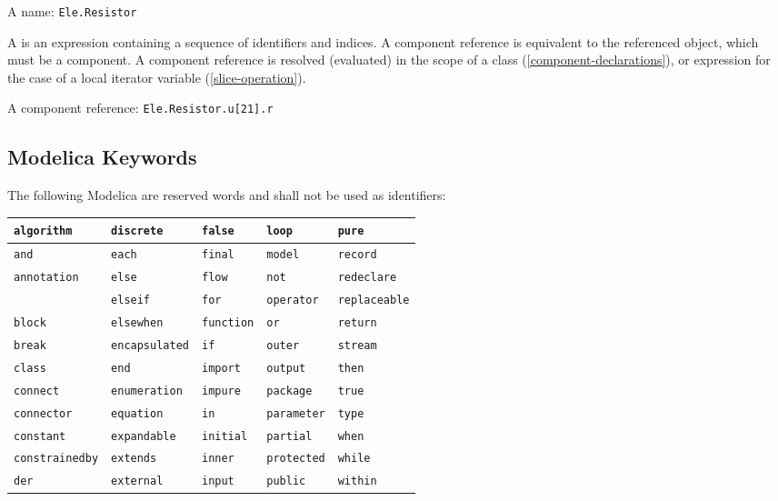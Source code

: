 \begin{example}
A name: \lstinline!Ele.Resistor!
\end{example}

A  is an expression containing a sequence of identifiers and indices.
A component reference is equivalent to the referenced object, which must be a component.
A component reference is resolved (evaluated) in the scope of a class (\cref{component-declarations}), or expression for the case of a local iterator variable (\cref{slice-operation}).

\begin{example}
A component reference: \lstinline!Ele.Resistor.u[21].r!
\end{example}

\subsection{Modelica Keywords}\label{modelica-keywords}

The following Modelica  are reserved words and shall not be used as identifiers:
\begin{center}
\begin{tabular}{l l l l l}
\lstinline!algorithm! & \lstinline!discrete! & \lstinline!false! & \lstinline!loop! & \lstinline!pure!\\ \hline
\lstinline!and! & \lstinline!each! & \lstinline!final! & \lstinline!model! & \lstinline!record!\\ \hline
\lstinline!annotation! & \lstinline!else! & \lstinline!flow! & \lstinline!not! & \lstinline!redeclare!\\ \hline
& \lstinline!elseif! & \lstinline!for! & \lstinline!operator! & \lstinline!replaceable!\\ \hline
\lstinline!block! & \lstinline!elsewhen! & \lstinline!function! & \lstinline!or! & \lstinline!return!\\ \hline
\lstinline!break! & \lstinline!encapsulated! & \lstinline!if! & \lstinline!outer! & \lstinline!stream!\\ \hline
\lstinline!class! & \lstinline!end! & \lstinline!import! & \lstinline!output! & \lstinline!then!\\ \hline
\lstinline!connect! & \lstinline!enumeration! & \lstinline!impure! & \lstinline!package! & \lstinline!true!\\ \hline
\lstinline!connector! & \lstinline!equation! & \lstinline!in! & \lstinline!parameter! & \lstinline!type!\\ \hline
\lstinline!constant! & \lstinline!expandable! & \lstinline!initial! & \lstinline!partial! & \lstinline!when!\\ \hline
\lstinline!constrainedby! & \lstinline!extends! & \lstinline!inner! & \lstinline!protected! & \lstinline!while!\\ \hline
\lstinline!der! & \lstinline!external! & \lstinline!input! & \lstinline!public! & \lstinline!within!\\
\end{tabular}
\end{center}

